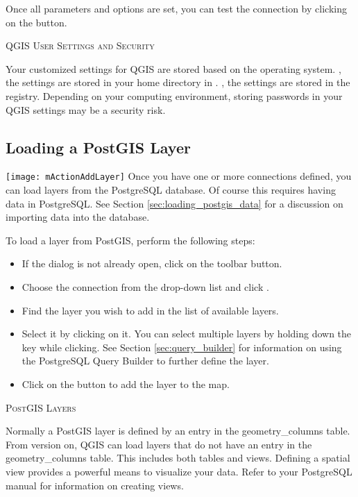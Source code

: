 Once all parameters and options are set, you can test the connection by
clicking on the  button.

\begin{Tip}\caption{\textsc{QGIS User Settings and
Security}}
Your customized settings for QGIS are stored based on the operating
system. \nix, the settings are stored in your home directory in
. \win, the settings are stored in the registry. Depending on
your computing environment, storing passwords in your QGIS settings may be a
security risk.
\end{Tip}

\subsection{Loading a PostGIS Layer}

\texttt{[image: mActionAddLayer]} Once you have one or more
connections defined, you can load layers from the PostgreSQL database. Of
course this requires having data in PostgreSQL. See Section
\ref{sec:loading_postgis_data} for a discussion on importing data into the
database. 

To load a layer from PostGIS, perform the following steps:

\begin{itemize}
\item If the  dialog is not already open, click on the
 toolbar button.
\item Choose the connection from the drop-down list and click .
\item Find the layer you wish to add in the list of available layers.
\item Select it by clicking on it. You can select multiple layers by holding
down the  key while clicking. See Section \ref{sec:query_builder} for
information on using the PostgreSQL Query Builder to further define the layer.
\item Click on the  button to add the layer to the map.
\end{itemize}

\begin{Tip}\caption{\textsc{PostGIS Layers}}
Normally a PostGIS layer is defined by an entry in the
geometry\_columns table. From version \OLD %
on, QGIS can load layers that do not have
an entry in the geometry\_columns table. This includes both tables and views.
Defining a spatial view provides a powerful means to visualize your data. Refer
to your PostgreSQL manual for information on creating views.
\end{Tip}

